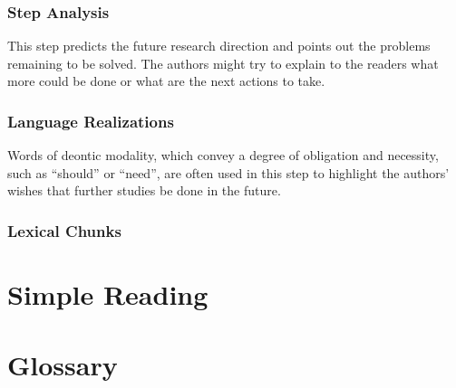 \documentclass{ctexbook}
\begin{document}
    \subsubsection{Step Analysis}

    This step predicts the future research direction and points out the problems remaining to be solved. The authors might try to explain to the readers what more could be done or what are the next actions to take.

    \subsubsection{Language Realizations}

    Words of deontic modality, which convey a degree of obligation and necessity, such as ``should'' or ``need'', are often used in this step to highlight the authors' wishes that further studies be done in the future.

    \subsubsection{Lexical Chunks}

\section{Simple Reading}

\section{Glossary}


\restoregeometry

\backmatter



	
\end{document}
